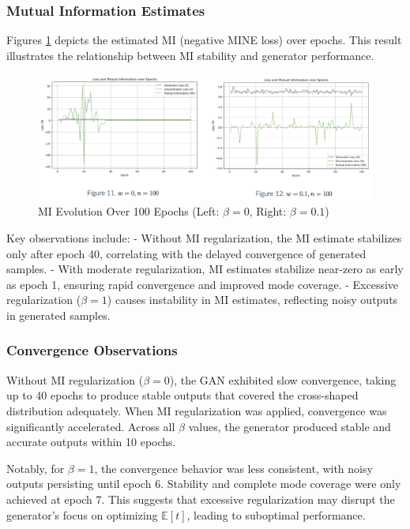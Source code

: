 \documentclass[lettersize,journal]{IEEEtran}
\begin{document}
\subsubsection{Mutual Information Estimates}  
Figures \ref{fig:mi-100epochs} depicts the estimated MI (negative MINE loss) over epochs. This result illustrates the relationship between MI stability and generator performance.

\begin{figure}[!ht]
    \centering
    \includegraphics[width=1\linewidth]{figures/mi_100epochs.png}
    \caption{MI Evolution Over 100 Epochs (Left: \( \beta = 0 \), Right: \( \beta = 0.1 \))}
    \label{fig:mi-100epochs}
\end{figure}

Key observations include:
- Without MI regularization, the MI estimate stabilizes only after epoch 40, correlating with the delayed convergence of generated samples.
- With moderate regularization, MI estimates stabilize near-zero as early as epoch 1, ensuring rapid convergence and improved mode coverage.
- Excessive regularization (\( \beta = 1 \)) causes instability in MI estimates, reflecting noisy outputs in generated samples.

\subsubsection{Convergence Observations}
Without MI regularization (\( \beta = 0 \)), the GAN exhibited slow convergence, taking up to 40 epochs to produce stable outputs that covered the cross-shaped distribution adequately.
When MI regularization was applied, convergence was significantly accelerated. Across all \( \beta \) values, the generator produced stable and accurate outputs within 10 epochs.

Notably, for \( \beta = 1 \), the convergence behavior was less consistent, with noisy outputs persisting until epoch 6. Stability and complete mode coverage were only achieved at epoch 7. This suggests that excessive regularization may disrupt the generator's focus on optimizing \( \mathbb{E}[t] \), leading to suboptimal performance.
\end{document}
